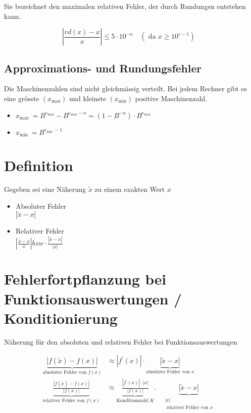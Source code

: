 Sie bezeichnet den maximalen relativen Fehler, der durch Rundungen entstehen kann.

$$
\left|\frac{r d(x)-x}{x}\right| \leq 5 \cdot 10^{-n} \quad\left(\text { da } x \geq 10^{e-1}\right)
$$

\subsection{Approximations- und Rundungsfehler}

Die Maschinenzahlen sind nicht gleichmässig verteilt. Bei jedem Rechner gibt es eine grösste $\left(x_{\max }\right)$ und kleinste $\left(x_{\min }\right)$ positive Maschinenzahl.

\begin{itemize}
  \item $x_{\text {max }}=B^{e_{\max }}-B^{e_{\max }-n}=\left(1-B^{-n}\right) \cdot B^{e_{\max }}$
  \item $x_{\text {min }}=B^{e_{\text {min }}-1}$
\end{itemize}

\section*{Definition}
Gegeben sei eine Näherung $\tilde{x}$ zu einem exakten Wert $x$

\begin{itemize}
  \item Absoluter Fehler\\
$|\tilde{x}-x|$
  \item Relativer Fehler\\
$\left|\frac{\tilde{x}-x}{x}\right| b z w \cdot \frac{|\tilde{x}-x|}{|x|}$
\end{itemize}

\section*{Fehlerfortpflanzung bei Funktionsauswertungen / Konditionierung}
Näherung für den absoluten und relativen Fehler bei Funktionsauswertungen

$$
\begin{aligned}
\underbrace{|f(\tilde{x})-f(x)|}_{\text {absoluter Fehler von } f(x)} & \approx\left|f^{\prime}(x)\right| \cdot \underbrace{|\tilde{x}-x|}_{\text {absoluter Fehler von } x} \\
\underbrace{\frac{|f(\tilde{x})-f(x)|}{|f(x)|}}_{\text {relativer Fehler von } f(x)} & \approx \underbrace{\frac{\left|f^{\prime}(x)\right| \cdot|x|}{|f(x)|}}_{\text {Konditionszahl } K} . \quad \underbrace{|\tilde{x}-x|}_{\begin{array}{c}
|x| \\
\text { relativer Fehler von } x
\end{array}}
\end{aligned}
$$

